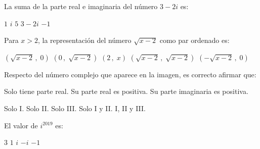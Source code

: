 \documentclass[]{srs}
\begin{document}
\begin{preguntas}[after-item-skip=2cm]
 \pregunta La suma de la parte real e imaginaria del número $3-2i$ es:\\
 \begin{vertical}
  \alternativa $1$
  \alternativa $i$
  \alternativa $5$
  \alternativa $3-2i$
  \alternativa $-1$
 \end{vertical}

 \pregunta Para $x > 2$, la representación del número $\sqrt{x-2}$ como par ordenado es:\\
\begin{vertical}
  \alternativa $\left(\sqrt{x-2}\,,\;0\right)$
  \alternativa $\left(0\,,\;\sqrt{x-2}\right)$
  \alternativa $\left(2\,,\;x\right)$
  \alternativa $\left(\sqrt{x-2}\,,\;\sqrt{x-2}\right)$
  \alternativa $\left(-\sqrt{x-2}\,,\;0\right)$
\end{vertical}

 \pregunta Respecto del número complejo que aparece en la imagen, es correcto
 afirmar que:\\
\begin{center}
\end{center}
\begin{vertical*}
  \alternativa Solo tiene parte real.
  \alternativa Su parte real es positiva.
  \alternativa Su parte imaginaria es positiva.
\end{vertical*}
\begin{vertical}
  \alternativa Solo I.
  \alternativa Solo II.
  \alternativa Solo III.
  \alternativa Solo I y II.
  \alternativa I, II y III.
\end{vertical}

\pregunta El valor de $i^{2019}$ es:\\
\begin{vertical}
  \alternativa $3$
  \alternativa $1$
  \alternativa $i$
  \alternativa $-i$
  \alternativa $-1$
\end{vertical}


\end{preguntas}
\end{document}
